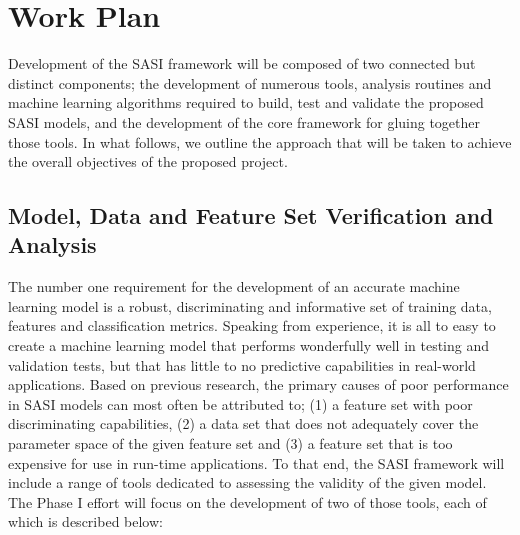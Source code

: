 \section{Work Plan} 
\label{sec:approach}


Development of the SASI framework will be composed of two connected but distinct components; the development of numerous tools, analysis routines and machine learning algorithms required to build, test and validate  the proposed SASI models, and the development of the core framework for gluing together those tools. In what follows, we outline the approach that will be taken to achieve the overall objectives of the proposed project. 

\subsection{ Model, Data and Feature Set Verification and Analysis }

The number one requirement for the development of an accurate machine learning model is a robust, discriminating and informative set of training data, features and classification metrics. Speaking from experience, it is all to easy to create a machine learning model that performs wonderfully well in testing and validation tests, but that has little to no predictive capabilities in real-world applications. Based on previous research, the primary causes of poor performance in SASI models can most often be attributed to; (1) a feature set with poor discriminating capabilities, (2) a data set that does not adequately cover the parameter space of the given feature set and (3) a feature set that is too expensive for use in run-time applications. To that end, the SASI framework will include a range of tools dedicated to assessing the validity of the given model. The Phase I effort will focus on the development of two of those tools, each of which is described below: 

